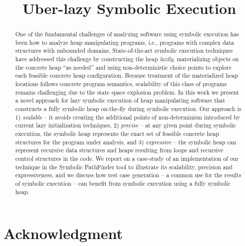 \documentclass[conference]{IEEEtran}
\begin{document}
%
\title{Uber-lazy Symbolic Execution}


\author{
\and
{}
}
\maketitle


\begin{abstract}
One of the fundamental challenges of analyzing software using
symbolic execution has been how to analyze heap manipulating
programs, i.e., programs with complex data structures with
unbounded domains. State-of-the-art symbolic execution techniques 
have addressed this challenge by constructing the heap \emph{lazily},
materializing objects on the concrete heap ``as needed'' and
using non-deterministic choice points to explore each feasible
concrete heap configuration. Because treatment of the materialized
heap locations follows concrete program semantics, scalability
of this class of programs remains challenging due to the 
state space explosion problem.
In this work we present a novel approach for lazy symbolic execution
of heap manipulating software that constructs 
a fully symbolic heap on-the-fly during symbolic execution.
Our approach is 1) \emph{scalable} -- it avoids
creating the additional points of non-determinism
introduced by current lazy initialization techniques, 
2) \emph{precise} -- at any given point during symbolic execution, 
the symbolic heap represents the exact set of feasible
concrete heap structures for the program under analysis, and
3) \emph{expressive} -- the symbolic heap can represent recursive data structures 
and heaps resulting from loops and recursive control structures in the code. 
We report on a case-study of an implementation of our technique in the
Symbolic PathFinder tool to illustrate its scalability, precision
and expressiveness, and we discuss how test case generation -- a common
 use for the results of symbolic execution -- can benefit from symbolic
 execution using a fully symbolic heap.
 
\end{abstract}
\IEEEpeerreviewmaketitle





%
%
%
%
\section*{Acknowledgment}



\end{document}
